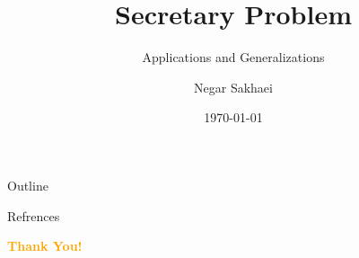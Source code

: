 \documentclass[aspectratio=43, compress]{beamer}
\title{Secretary Problem}
\subtitle{Applications and Generalizations}
\author[N. Sakhaei]{Negar Sakhaei}
\date{\today}
\begin{document}
    
    \frame{\titlepage}
    \begin{frame}{Outline}
        \tableofcontents
    \end{frame}
    
    
    


        \begin{frame}[allowframebreaks]{Refrences}
            \printbibliography
        \end{frame}

    \begin{frame}{}
        \centering
            \Huge\bfseries
        \textcolor{orange}{Thank You!}
    \end{frame}
\end{document}
